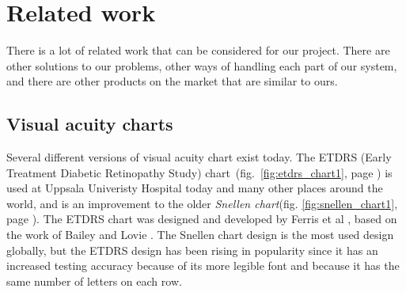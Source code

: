 \documentclass[12pt,a4paper,notitlepage]{report}
\begin{document}
\clearpage
\section{Related work}
There is a lot of related work that can be considered for our project. There are other solutions to our problems, other ways of handling each part of our system, and there are other products on the market that are similar to ours.

\subsection{Visual acuity charts}%
Several different versions of visual acuity chart exist today. The ETDRS (Early Treatment Diabetic Retinopathy Study) chart~(fig.~\ref{fig:etdrs_chart1}, page \pageref{fig:etdrs_chart1}) is used at Uppsala Univeristy Hospital today and many other places around the world, and is an improvement to the older \textit{Snellen chart}(fig. \ref{fig:snellen_chart1}, page \pageref{fig:snellen_chart1}). The ETDRS chart was designed and developed by Ferris et al \cite{Ferris}, based on the work of Bailey and Lovie \cite{Bailey}. The Snellen chart design is the most used design globally, but the ETDRS design has been rising in popularity since it has an increased testing accuracy because of its more legible font and because it has the same number of letters on each row.

\end{document}
